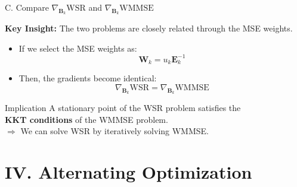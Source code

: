\documentclass[aspectratio=169, 10pt]{beamer}
\begin{document}
\begin{frame}{C. Compare $\nabla_{\mathbf{B}_k} \mathrm{WSR}$ and $\nabla_{\mathbf{B}_k} \mathrm{WMMSE}$}

    \textbf{Key Insight:} The two problems are closely related through the MSE weights.

    \begin{itemize}
        \item I{}f we select the MSE weights as:
              \begin{equation*}
                  \mathbf{W}_k = u_k \mathbf{E}_k^{-1}
              \end{equation*}

        \item Then, the gradients become identical:
              \begin{equation*}
                  \nabla_{\mathbf{B}_k} \mathrm{WSR} = \nabla_{\mathbf{B}_k} \mathrm{WMMSE}
              \end{equation*}
    \end{itemize}

    \vspace{0.3cm}

    \begin{alertblock}{Implication}
        \centering
        A stationary point of the WSR problem satisfies the \\
        \textbf{KKT conditions} of the WMMSE problem.
        \\ $\Rightarrow$ We can solve WSR by iteratively solving WMMSE.
    \end{alertblock}

\end{frame}


\section{IV. Alternating Optimization}
\end{document}
